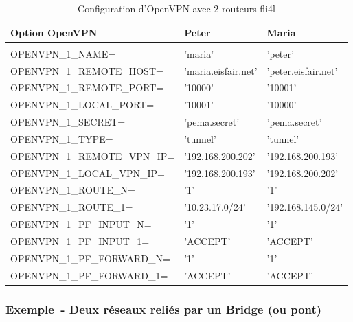 \begin{table}[htbp]
  \begin{scriptsize}
    \begin{tabular}{lll}
      Option OpenVPN                 & Peter               & Maria               \\
      \hline \\
      OPENVPN\_1\_NAME=              & 'maria'             & 'peter'             \\
      OPENVPN\_1\_REMOTE\_HOST=      & 'maria.eisfair.net' & 'peter.eisfair.net' \\
      OPENVPN\_1\_REMOTE\_PORT=      & '10000'             & '10001'             \\
      OPENVPN\_1\_LOCAL\_PORT=       & '10001'             & '10000'             \\
      OPENVPN\_1\_SECRET=            & 'pema.secret'       & 'pema.secret'       \\
      OPENVPN\_1\_TYPE=              & 'tunnel'            & 'tunnel'            \\
      OPENVPN\_1\_REMOTE\_VPN\_IP=   & '192.168.200.202'   & '192.168.200.193'   \\
      OPENVPN\_1\_LOCAL\_VPN\_IP=    & '192.168.200.193'   & '192.168.200.202'   \\
      OPENVPN\_1\_ROUTE\_N=          & '1'                 & '1'                 \\
      OPENVPN\_1\_ROUTE\_1=          & '10.23.17.0/24'     & '192.168.145.0/24'  \\
      OPENVPN\_1\_PF\_INPUT\_N=      & '1'                 & '1'                 \\
      OPENVPN\_1\_PF\_INPUT\_1=      & 'ACCEPT'            & 'ACCEPT'            \\
      OPENVPN\_1\_PF\_FORWARD\_N=    & '1'                 & '1'                 \\
      OPENVPN\_1\_PF\_FORWARD\_1=    & 'ACCEPT'            & 'ACCEPT'            \\
    \end{tabular}
  \end{scriptsize}
  \caption{Configuration d'OpenVPN avec 2 routeurs fli4l}
\end{table}

\subsubsection{Exemple~- Deux réseaux reliés par un Bridge (ou pont)}

